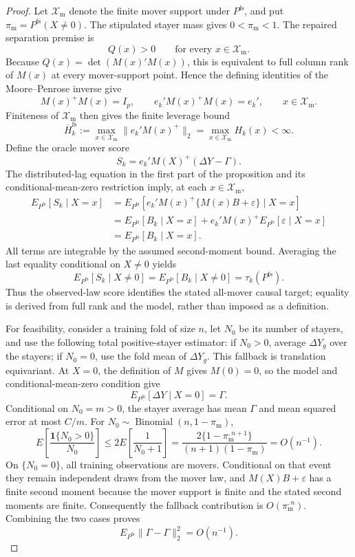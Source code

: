 \documentclass{article}
\begin{document}
\begin{proof}
Let \(\mathcal X_{\mathrm m}\) denote the finite mover support under \(P^{\mathrm{fs}}\), and put \(\pi_{\mathrm m}=P^{\mathrm{fs}}(X\ne0)\).  The stipulated stayer mass gives \(0<\pi_{\mathrm m}<1\).  The repaired separation premise is
\[
Q(x)>0\qquad\text{for every }x\in\mathcal X_{\mathrm m}.
\]
Because \(Q(x)=\det(M(x)'M(x))\), this is equivalent to full column rank of \(M(x)\) at every mover-support point.  Hence the defining identities of the Moore--Penrose inverse give
\[
M(x)^+M(x)=I_p,
\qquad
e_k'M(x)^+M(x)=e_k',
\qquad x\in\mathcal X_{\mathrm m}.
\]
Finiteness of \(\mathcal X_{\mathrm m}\) then gives the finite leverage bound
\[
\overline H_k^{\mathrm{fs}}
:=\max_{x\in\mathcal X_{\mathrm m}}\lVert e_k'M(x)^+\rVert_2
=\max_{x\in\mathcal X_{\mathrm m}}H_k(x)<\infty.
\]
Define the oracle mover score
\[
S_k=e_k'M(X)^+(\Delta Y-\Gamma).
\]
The distributed-lag equation in the first part of the proposition and its conditional-mean-zero restriction imply, at each \(x\in\mathcal X_{\mathrm m}\),
\[
\begin{aligned}
E_{P^{\mathrm{fs}}}[S_k\mid X=x]
&=E_{P^{\mathrm{fs}}}[e_k'M(x)^+\{M(x)B+\varepsilon\}\mid X=x]\\
&=E_{P^{\mathrm{fs}}}[B_k\mid X=x]
+e_k'M(x)^+E_{P^{\mathrm{fs}}}[\varepsilon\mid X=x]\\
&=E_{P^{\mathrm{fs}}}[B_k\mid X=x].
\end{aligned}
\]
All terms are integrable by the assumed second-moment bound.  Averaging the last equality conditional on \(X\ne0\) yields
\[
E_{P^{\mathrm{fs}}}[S_k\mid X\ne0]
=E_{P^{\mathrm{fs}}}[B_k\mid X\ne0]
=\tau_k(P^{\mathrm{fs}}).
\]
Thus the observed-law score identifies the stated all-mover causal target; equality is derived from full rank and the model, rather than imposed as a definition.

For feasibility, consider a training fold of size \(n\), let \(N_0\) be its number of stayers, and use the following total positive-stayer estimator: if \(N_0>0\), average \(\Delta Y_g\) over the stayers; if \(N_0=0\), use the fold mean of \(\Delta Y_g\).  This fallback is translation equivariant.  At \(X=0\), the definition of \(M\) gives \(M(0)=0\), so the model and conditional-mean-zero condition give
\[
E_{P^{\mathrm{fs}}}[\Delta Y\mid X=0]=\Gamma.
\]
Conditional on \(N_0=m>0\), the stayer average has mean \(\Gamma\) and mean squared error at most \(C/m\).  For \(N_0\sim\operatorname{Binomial}(n,1-\pi_{\mathrm m})\),
\[
E\!\left[\frac{\mathbf 1\{N_0>0\}}{N_0}\right]
\le 2E\!\left[\frac1{N_0+1}\right]
=\frac{2\{1-\pi_{\mathrm m}^{,n+1}\}}{(n+1)(1-\pi_{\mathrm m})}
=O(n^{-1}).
\]
On \(\{N_0=0\}\), all training observations are movers.  Conditional on that event they remain independent draws from the mover law, and \(M(X)B+\varepsilon\) has a finite second moment because the mover support is finite and the stated second moments are finite.  Consequently the fallback contribution is \(O(\pi_{\mathrm m}^{,n})\).  Combining the two cases proves
\[
E_{P^{\mathrm{fs}}}\lVert\widehat\Gamma-\Gamma\rVert_2^2=O(n^{-1}).
\]


\end{proof}
\end{document}
